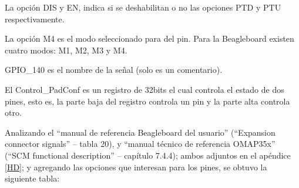 La opción DIS y EN, indica si se deshabilitan o no las opciones PTD y PTU respectivamente. 

La opción M4 es el modo seleccionado para del pin. Para la Beagleboard existen cuatro modos: M1, M2, M3 y M4.

\bigskip
GPIO\_140 es el nombre de la señal (solo es un comentario). 

\bigskip
El Control\_PadConf es un registro de 32bits el cual controla el estado de dos pines, esto es, la parte 
baja del registro controla un pin y la parte alta controla otro. 

Analizando el “manual de referencia Beagleboard del usuario” (“Expansion connector signals” – tabla 20), y “manual técnico de referencia OMAP35x” (“SCM functional description” – capítulo 7.4.4); ambos adjuntos en el apéndice \ref{HD}; y agregando las opciones que interesan para los pines, se obtuvo la siguiente tabla: 

